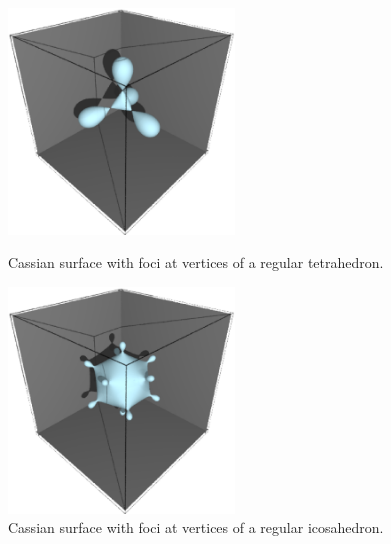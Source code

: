 \documentclass{article}
\begin{document}
\begin{figure}[H]
\begin{minipage}{.5\hsize}
\begin{center}
\includegraphics[width=6cm]{tetrahedral_cassini.eps}
\caption{Cassian surface with foci at vertices of a regular tetrahedron.}
\label{}
\end{center}
\end{minipage}
\begin{minipage}{0.5\hsize}
\begin{center}
\includegraphics[width=6cm]{icosahedral_cassini.eps}
\caption{Cassian surface with foci at vertices of a regular icosahedron.}
\label{}
\end{center}
\end{minipage}
\end{figure}
\end{document}
